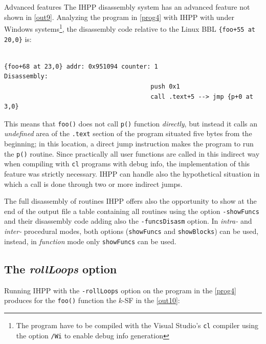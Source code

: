 \documentclass[a4paper,10pt]{report}
\begin{document}
\begin{paragraph}{Advanced features}
The IHPP disassembly system has an advanced feature not shown in \cref{out9}.
Analyzing the program in \cref{prog4} with IHPP with under Windows 
systems\footnote{The program have to be compiled with the Visual Studio's \texttt{cl} 
compiler using the option \texttt{\slash Wi} to enable debug info generation},
the disassembly code relative to the Linux BBL \verb|{foo+55 at 20,0}| is:
\begin{lstlisting}[language={[x86masm]Assembler}, 
	label=out10, caption={an example of an indirect call}, frame=bottomline]

{foo+68 at 23,0} addr: 0x951094 counter: 1	
Disassembly: 
										push 0x1
										call .text+5 --> jmp {p+0 at 3,0}
\end{lstlisting}

This means that \verb|foo()| does not call \verb|p()| function \emph{directly}, 
but instead it calls an \emph{undefined} area of the \verb|.text| section of the program situated five bytes from the beginning; in this location, a direct jump instruction
makes the program to run the \verb|p()| routine. Since practically all user functions
are called in this indirect way when compiling with \verb|cl| programs with debug info,
the implementation of this feature was strictly necessary. IHPP can handle also
the hypothetical situation in which a call is done through two or more indirect jumps.
\end{paragraph}

\begin{paragraph}{The full disassembly of routines}
IHPP offers also the opportunity to show at the end of the output file 
a table containing all routines using the option \verb|-showFuncs| and their 
disassembly code adding also the \verb|-funcsDisasm| option.  
In \emph{intra-} and \emph{inter-} procedural modes, both options (\verb|showFuncs| and \verb|showBlocks|) can be used, instead, in \emph{function} mode only \verb|showFuncs| can be used.
\end{paragraph}

\subsection{The \emph{rollLoops} option}

Running IHPP with the \verb|-rollLoops| option on the program in the \cref{prog4}
produces for the \verb|foo()| function the $k$-SF in the \cref{out10}:
\end{document}

